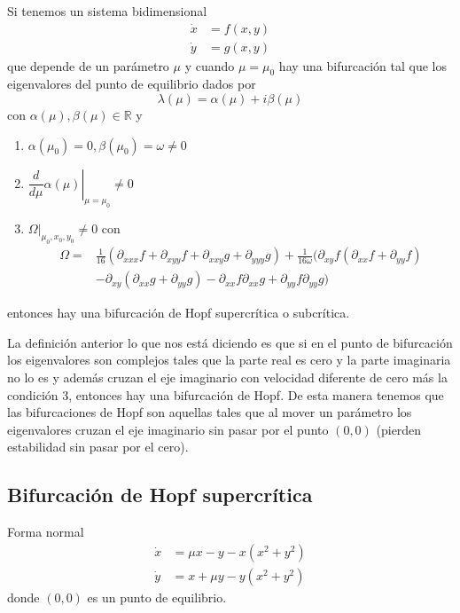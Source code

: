 \begin{tcolorbox}[colback=Black!5, colframe=White, arc=2mm]
	\begin{teorema}
	Si tenemos un sistema bidimensional 
	\begin{align*}
	  \dot{x} &= f(x,y) \\
	  \dot{y} &= g(x,y) 
	\end{align*}
	que depende de un parámetro $ \mu$ y cuando $ \mu=\mu_0$ hay una bifurcación tal que los eigenvalores del punto de equilibrio dados por \begin{equation*}
	  \lambda(\mu) = \alpha(\mu) + i \beta (\mu)
	\end{equation*} 
	con $\alpha(\mu), \beta(\mu)\in \mathbb{R}$ y
	\begin{enumerate}
		\item $\alpha(\mu_0)=0, \beta(\mu_0)=\omega \neq 0$
		\item $ \left. \dfrac{d}{d \mu} \alpha(\mu)   \right|_{\mu=\mu_0}\neq 0 $
		\item $ \left. \Omega \right|_{\mu_0,x_0,y_0}  \neq 0$ con 
			\begin{equation*}
		  \begin{split}
				\Omega =& \frac{1}{16} \left( \partial_{x x x}f + \partial_{x y y}f + \partial_{x x y}g + \partial_{y y y}g \right)  + \frac{1}{16 \omega} ( \partial_{xy}f(\partial_{x x}f+\partial_{yy}f) \\
								&- \partial_{xy}(\partial_{x x}g+ \partial_{y y}g)  -\partial_{x x}f \partial_{x x}g + \partial_{yy}f \partial_{y y}g) 
		  \end{split}
		\end{equation*}
	\end{enumerate}
	entonces hay una bifurcación de Hopf supercrítica o subcrítica.
\end{teorema}
\end{tcolorbox}
La definición anterior lo que nos está diciendo es que si en el punto de bifurcación los eigenvalores son complejos tales que la parte real es cero y la parte imaginaria no lo es y además cruzan el eje imaginario con velocidad diferente de cero más la condición 3, entonces hay una bifurcación de Hopf. De esta manera tenemos que las bifurcaciones de Hopf son aquellas tales que al mover un parámetro los eigenvalores cruzan el eje imaginario sin pasar por el punto $(0,0)$ (pierden estabilidad sin pasar por el cero).   
\subsection{Bifurcación de Hopf supercrítica}
Forma normal
\begin{align*}
  \dot{x} &= \mu x - y - x(x^2+y^2) \\
  \dot{y} &= x + \mu y - y(x^2+y^2)  
\end{align*}
donde $(0,0)$ es un punto de equilibrio.
\vspace{2mm}

